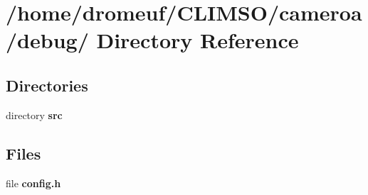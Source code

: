 \section{/home/dromeuf/CLIMSO/cameroa/debug/ Directory Reference}
\label{dir_c66a385af4e929c8f79d05a56146efca}
\subsection*{Directories}
\begin{CompactItemize}
\item 
directory {\bf src}
\end{CompactItemize}
\subsection*{Files}
\begin{CompactItemize}
\item 
file {\bf config.h}
\end{CompactItemize}
